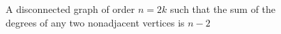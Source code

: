 \begin{figure}[h]
	\caption{A disconnected graph of order $n=2k$ such that the sum of the degrees of any two nonadjacent vertices is $n-2$}
\end{figure}